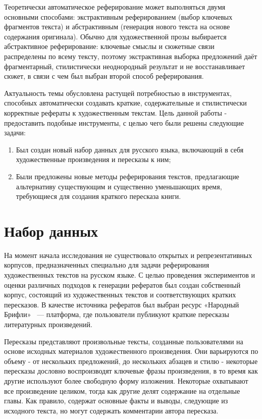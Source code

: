 \documentclass{article}
\begin{document}
Теоретически автоматическое реферирование может выполняться двумя основными способами: экстрактивным реферированием (выбор ключевых фрагментов текста) и абстрактивным (генерация нового текста на основе содержания оригинала). 
Обычно для художественной прозы выбирается абстрактивное реферирование: 
ключевые смыслы и сюжетные связи распределены по всему тексту, поэтому экстрактивная выборка предложений даёт фрагментарный, 
стилистически неоднородный результат и не восстанавливает сюжет, в связи с чем был выбран второй способ реферирования.

Актуальность темы обусловлена растущей потребностью в инструментах, способных
автоматически создавать краткие, содержательные и стилистически корректные рефераты к художественным текстам.
Цель данной работы - предоставить подобные инструменты, с целью чего были решены следующие задачи:
\begin{enumerate}
  \item Был создан новый набор данных для русского языка, включающий в себя художественные произведения и пересказы к ним;
  \item Были предложены новые методы реферирования текстов, предлагающие альтернативу существующим и существенно уменьшающих время, требующиеся для создания краткого пересказа книги.
\end{enumerate}


\section*{Набор данных}
На момент начала исследования не существовало открытых и репрезентативных корпусов, предназначенных специально для задачи реферирования художественных текстов на русском языке. 
С целью проведения экспериментов и оценки различных подходов к генерации рефератов был создан собственный корпус, состоящий из художественных текстов и соответствующих кратких пересказов. 
В качестве источника рефератов был выбран ресурс «Народный Брифли»~\cite{Briefly} — платформа, где пользователи публикуют краткие пересказы литературных произведений. 

Пересказы представляют произвольные тексты, созданные пользователями на основе исходных материалов художественного произведения. Они варьируются по объему - от нескольких предложений,
до нескольких абзацев и стилю - некоторые пересказы дословно воспроизводят ключевые фразы произведения, в то время как другие используют более свободную форму изложения. Некоторые
охватывают все произведение целиком, тогда как другие делят содержание на отдельные главы. 
Как правило, содержат основные факты и выводы, следующие из исходного текста, но могут содержать комментарии автора пересказа.
\end{document}

